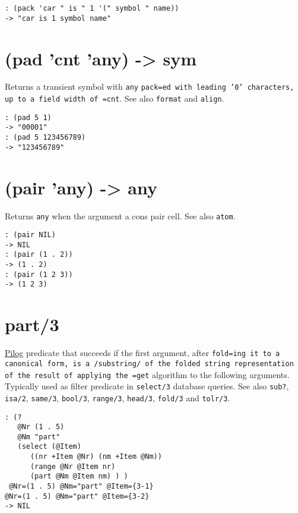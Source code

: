 {{{{{{{\begin{verbatim}
: (pack 'car " is " 1 '(" symbol " name))
-> "car is 1 symbol name"
\end{verbatim}

 
\section{(pad 'cnt 'any) -> sym}
\label{sec-8-1-16-5}


Returns a transient symbol with \texttt{any} \texttt{pack=ed with leading '0' characters, up to a field width of =cnt}. See also \texttt{format} and \texttt{align}.


\begin{verbatim}
: (pad 5 1)
-> "00001"
: (pad 5 123456789)
-> "123456789"
\end{verbatim}

 
\section{(pair 'any) -> any}
\label{sec-8-1-16-6}


Returns \texttt{any} when the argument a cons pair cell. See also \texttt{atom}.


\begin{verbatim}
: (pair NIL)
-> NIL
: (pair (1 . 2))
-> (1 . 2)
: (pair (1 2 3))
-> (1 2 3)
\end{verbatim}

 
\section{part/3}
\label{sec-8-1-16-7}


\hyperref[ref.html-pilog]{Pilog} predicate that succeeds if the first argument,
after \texttt{fold=ing it to a canonical form, is a /substring/ of the folded string representation of the result of applying the =get} algorithm to
the following arguments. Typically used as filter predicate in
\texttt{select/3} database queries. See also \texttt{sub?}, \texttt{isa/2}, \texttt{same/3},
\texttt{bool/3}, \texttt{range/3}, \texttt{head/3}, \texttt{fold/3} and \texttt{tolr/3}.


\begin{verbatim}
: (?
   @Nr (1 . 5)
   @Nm "part"
   (select (@Item)
      ((nr +Item @Nr) (nm +Item @Nm))
      (range @Nr @Item nr)
      (part @Nm @Item nm) ) )
 @Nr=(1 . 5) @Nm="part" @Item={3-1}                                              @Nr=(1 . 5) @Nm="part" @Item={3-2}
-> NIL
\end{verbatim}

}}}}}}}
